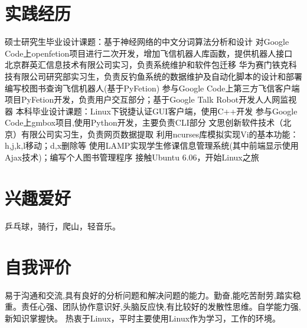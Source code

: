 \documentclass[a4paper]{moderncv}
\begin{document}
\begin{CJK*}{UTF8}{gbsn}
\section{实践经历}
{ 硕士研究生毕业设计课题：基于神经网络的中文分词算法分析和设计 }
{ 对Google Code上openfetion项目进行二次开发，增加飞信机器人库函数，提供机器人接口 }
{ 北京群英汇信息技术有限公司实习，负责系统维护和软件包迁移}
{ 华为赛门铁克科技有限公司研究部实习生，负责反钓鱼系统的数据维护及自动化脚本的设计和部署}
{ 编写校图书查询飞信机器人(基于PyFetion)}
{ 参与Google Code上第三方飞信客户端项目PyFetion开发，负责用户交互部分；基于Google Talk Robot开发人人网监视器}
{ 本科毕业设计课题：Linux下锐捷认证GUI客户端，使用C++开发 }
{ 参与Google Code上gmbox项目,使用Python开发，主要负责CLI部分 }
{ 文思创新软件技术（北京）有限公司实习生，负责网页数据提取 }
{ 利用ncurses库模拟实现Vi的基本功能：h,j,k,l移动；d,x删除等 }
{ 使用LAMP实现学生修课信息管理系统(其中前端显示使用Ajax技术)；编写个人图书管理程序 }
{ 接触Ubuntu 6.06，开始Linux之旅}
\section{兴趣爱好}
\cvitem{}
{
\small 乒乓球，骑行，爬山，轻音乐。
}
\section{自我评价}
\cvitem{}{}
{

易于沟通和交流,具有良好的分析问题和解决问题的能力。勤奋,能吃苦耐劳,踏实稳重。责任心强、团队协作意识好,头脑反应快,有比较好的发散性思维。自学能力强,新知识掌握快。
热衷于Linux，平时主要使用Linux作为学习，工作的环境。
}
\closesection
\end{CJK*}
\end{document}
